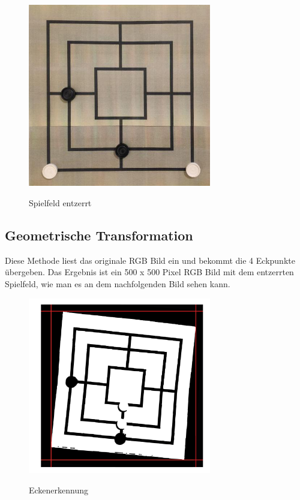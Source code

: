 \documentclass[paper=A4, deutsch]{scrartcl}
\begin{document}
\begin{figure}[ht]
	\centering
		\includegraphics[width=8cm]{Spielbrett_Entzerrt.png}\\
	\caption[Spielfeld entzerrt]{Spielfeld entzerrt}
	\label{fig:nettop}
\end{figure}

\subsection{Geometrische Transformation}
Diese Methode liest das originale RGB Bild ein und bekommt die 4 Eckpunkte übergeben. Das Ergebnis ist ein 500 x 500 Pixel RGB Bild mit dem entzerrten Spielfeld, wie man es an dem nachfolgenden Bild sehen kann.\\

\begin{figure}[ht]
	\centering
		\includegraphics[width=8cm]{Ecken.png}\\
	\caption[Eckenerkennung]{Eckenerkennung}
	\label{fig:nettop}
\end{figure}
\end{document}

